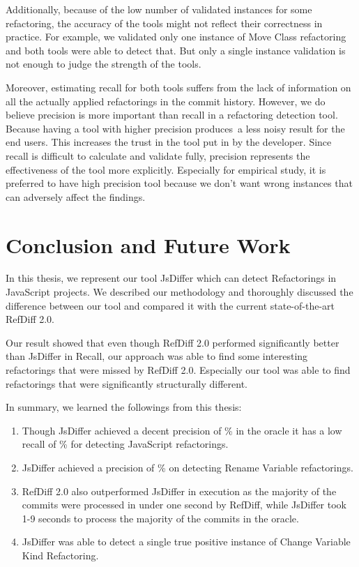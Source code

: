 \documentclass[letterpaper,12pt,onecolumn,final]{report}
\begin{document}
Additionally, because of the low number of validated instances for some refactoring, the accuracy of the tools might not reflect their correctness in practice. For example, we validated only one instance of Move Class refactoring and both tools were able to detect that. But only a single instance validation is not enough to judge the strength of the tools.

Moreover, estimating recall for both tools suffers from the lack of information on all the actually applied refactorings in the commit history. However, we do believe precision is more important than recall in a refactoring detection tool. Because having a tool with higher precision produces a less noisy result for the end users. This increases the trust in the tool put in by the developer. Since recall is difficult to calculate and validate fully, precision represents the effectiveness of the tool more explicitly. Especially for empirical study, it is preferred to have high precision tool because we don't want wrong instances that can adversely affect the findings.

\chapter{Conclusion and Future Work}
\label{chap:conclusion}

In this thesis, we represent our tool JsDiffer which can detect Refactorings in JavaScript projects. We described our methodology and thoroughly discussed the difference between our tool and compared it with the current state-of-the-art RefDiff 2.0.

Our result showed that even though RefDiff 2.0 performed significantly better than JsDiffer in Recall, our approach was able to find some interesting refactorings that were missed by RefDiff 2.0. Especially our tool was able to find refactorings that were significantly structurally different.


In summary, we learned the followings from this thesis:

\begin{enumerate}
\item Though JsDiffer achieved a decent precision of \rmOverallPrecision{}\% in the oracle it has a low recall of \rmOverallRecall{}\%    for detecting JavaScript refactorings. 
\item JsDiffer achieved a precision of \renameVarPrecision{}\% on detecting Rename Variable refactorings.
\item RefDiff 2.0 also outperformed JsDiffer in execution as the majority of the commits were processed in under one second by RefDiff, while JsDiffer took 1-9 seconds to process the majority of the commits in the oracle.
\item JsDiffer was able to detect a single true positive instance of Change Variable Kind Refactoring.
\end{enumerate}
\end{document}
